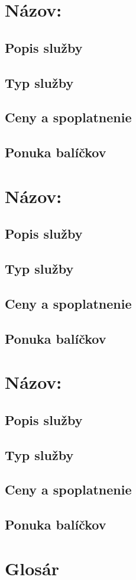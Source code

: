 \documentclass[a4paper, 11pt]{article}
\begin{document}
\section*{Názov:}
\subsection*{Popis služby}
\subsection*{Typ služby}
\subsection*{Ceny a spoplatnenie}
\subsection*{Ponuka balíčkov}

\section*{Názov:}
\subsection*{Popis služby}
\subsection*{Typ služby}
\subsection*{Ceny a spoplatnenie}
\subsection*{Ponuka balíčkov}

\section*{Názov:}
\subsection*{Popis služby}
\subsection*{Typ služby}
\subsection*{Ceny a spoplatnenie}
\subsection*{Ponuka balíčkov}



\clearpage
\section*{Glosár}
\end{document}
